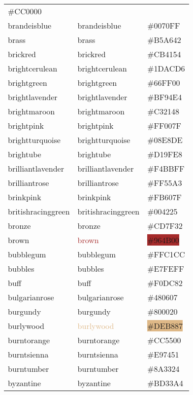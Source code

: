 \documentclass[
]{article}
\begin{document}
\begin{longtable}[]{@{}lll@{}}
\colorbox{bostonuniversityred}{\#CC0000}\tabularnewline
brandeisblue & \textcolor{brandeisblue}{brandeisblue} &
\colorbox{brandeisblue}{\#0070FF}\tabularnewline
brass & \textcolor{brass}{brass} &
\colorbox{brass}{\#B5A642}\tabularnewline
brickred & \textcolor{brickred}{brickred} &
\colorbox{brickred}{\#CB4154}\tabularnewline
brightcerulean & \textcolor{brightcerulean}{brightcerulean} &
\colorbox{brightcerulean}{\#1DACD6}\tabularnewline
brightgreen & \textcolor{brightgreen}{brightgreen} &
\colorbox{brightgreen}{\#66FF00}\tabularnewline
brightlavender & \textcolor{brightlavender}{brightlavender} &
\colorbox{brightlavender}{\#BF94E4}\tabularnewline
brightmaroon & \textcolor{brightmaroon}{brightmaroon} &
\colorbox{brightmaroon}{\#C32148}\tabularnewline
brightpink & \textcolor{brightpink}{brightpink} &
\colorbox{brightpink}{\#FF007F}\tabularnewline
brightturquoise & \textcolor{brightturquoise}{brightturquoise} &
\colorbox{brightturquoise}{\#08E8DE}\tabularnewline
brightube & \textcolor{brightube}{brightube} &
\colorbox{brightube}{\#D19FE8}\tabularnewline
brilliantlavender & \textcolor{brilliantlavender}{brilliantlavender} &
\colorbox{brilliantlavender}{\#F4BBFF}\tabularnewline
brilliantrose & \textcolor{brilliantrose}{brilliantrose} &
\colorbox{brilliantrose}{\#FF55A3}\tabularnewline
brinkpink & \textcolor{brinkpink}{brinkpink} &
\colorbox{brinkpink}{\#FB607F}\tabularnewline
britishracinggreen & \textcolor{britishracinggreen}{britishracinggreen}
& \colorbox{britishracinggreen}{\#004225}\tabularnewline
bronze & \textcolor{bronze}{bronze} &
\colorbox{bronze}{\#CD7F32}\tabularnewline
brown & \textcolor{brown}{brown} &
\colorbox{brown}{\#964B00}\tabularnewline
bubblegum & \textcolor{bubblegum}{bubblegum} &
\colorbox{bubblegum}{\#FFC1CC}\tabularnewline
bubbles & \textcolor{bubbles}{bubbles} &
\colorbox{bubbles}{\#E7FEFF}\tabularnewline
buff & \textcolor{buff}{buff} & \colorbox{buff}{\#F0DC82}\tabularnewline
bulgarianrose & \textcolor{bulgarianrose}{bulgarianrose} &
\colorbox{bulgarianrose}{\#480607}\tabularnewline
burgundy & \textcolor{burgundy}{burgundy} &
\colorbox{burgundy}{\#800020}\tabularnewline
burlywood & \textcolor{burlywood}{burlywood} &
\colorbox{burlywood}{\#DEB887}\tabularnewline
burntorange & \textcolor{burntorange}{burntorange} &
\colorbox{burntorange}{\#CC5500}\tabularnewline
burntsienna & \textcolor{burntsienna}{burntsienna} &
\colorbox{burntsienna}{\#E97451}\tabularnewline
burntumber & \textcolor{burntumber}{burntumber} &
\colorbox{burntumber}{\#8A3324}\tabularnewline
byzantine & \textcolor{byzantine}{byzantine} &
\colorbox{byzantine}{\#BD33A4}\tabularnewline

\end{longtable}
\end{document}

